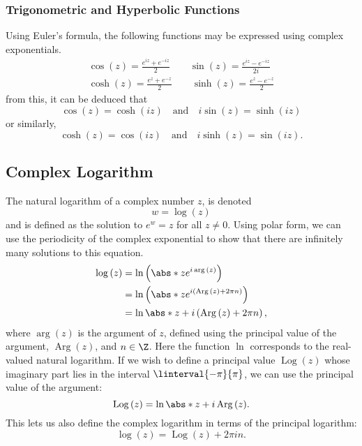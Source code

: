 \documentclass{article}
\DeclareMathOperator{\Arg}{Arg}
\DeclareMathOperator{\Log}{Log}
\begin{document}
\subsubsection{Trigonometric and Hyperbolic Functions}
Using Euler's formula, the following functions may be expressed using
complex exponentials.
\begin{align*}
    \cos{\left( z \right)} = \frac{e^{i z} + e^{-i z}}{2} \qquad \sin{\left( z \right)} = \frac{e^{i z} - e^{-i z}}{2i} \\
    \cosh{\left( z \right)} = \frac{e^{z} + e^{-z}}{2} \qquad \sinh{\left( z \right)} = \frac{e^{z} - e^{-z}}{2}
\end{align*}
from this, it can be deduced that
\begin{equation*}
    \cos{\left( z \right)} = \cosh{\left( i z \right)} \quad \text{and} \quad i \sin{\left( z \right)} = \sinh{\left( i z \right)}
\end{equation*}
or similarly,
\begin{equation*}
    \cosh{\left( z \right)} = \cos{\left( i z \right)} \quad \text{and} \quad i \sinh{\left( z \right)} = \sin{\left( i z \right)}.
\end{equation*}
\subsection{Complex Logarithm}
The natural logarithm of a complex number \(z\), is denoted
\begin{equation*}
    w = \log{\left( z \right)}
\end{equation*}
and is defined as the solution to \(e^w = z\) for all \(z \neq 0\).
Using polar form, we can use the periodicity of the complex exponential
to show that there are infinitely many solutions to this equation.
\begin{align*}
    \log{\left( z \right)} & = \ln{\left( \abs*{z} e^{i \arg{\left( z \right)}} \right)} \\
                           & = \ln{\left( \abs*{z} e^{i \left( \Arg{\left( z \right)} + 2\pi n\right)} \right)} \\
                           & = \ln{\abs*{z}} + i \left( \Arg{\left( z \right)} + 2 \pi n \right),
\end{align*}
where \(\arg{\left( z \right)}\) is the argument of \(z\), defined using
the principal value of the argument, \(\Arg{\left( z \right)}\), and
\(n \in \Z\). Here the function \(\ln\) corresponds to the real-valued
natural logarithm. If we wish to define a principal value \(\Log{\left( z
\right)}\) whose imaginary part lies in the interval
\(\linterval{-\pi}{\pi}\), we can use the principal value of the
argument:
\begin{equation*}
    \Log{\left( z \right)} = \ln{\abs*{z}} + i \Arg{\left( z \right)}.
\end{equation*}
This lets us also define the complex logarithm in terms of the principal
logarithm:
\begin{equation*}
    \log{\left( z \right)} = \Log{\left( z \right)} + 2 \pi i n.
\end{equation*}
\end{document}
